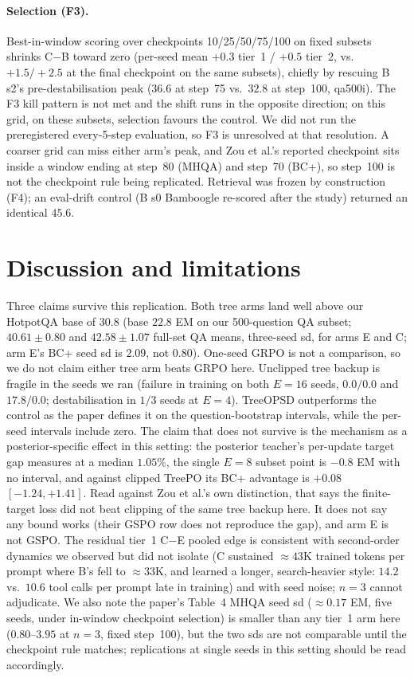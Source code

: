 \documentclass[11pt]{article}
\begin{document}
\paragraph{Selection (F3).} Best-in-window scoring over checkpoints
10/25/50/75/100 on fixed subsets shrinks C$-$B toward zero (per-seed mean
$+0.3$ tier~1 / $+0.5$ tier~2, vs.\ $+1.5/+2.5$ at the final checkpoint
on the same subsets), chiefly by rescuing B s2's pre-destabilisation peak
($36.6$ at step~75 vs.\ $32.8$ at step~100, qa500i). The F3 kill pattern
is not met and the shift runs in the opposite direction; on this grid,
on these subsets, selection favours the control. We did not run the
preregistered every-5-step evaluation, so F3 is unresolved at that
resolution. A coarser grid can miss either arm's peak, and Zou et al.'s
reported checkpoint sits inside a window ending at step~80 (MHQA) and
step~70 (BC+), so step~100 is not the checkpoint rule being replicated.
Retrieval was
frozen by construction (F4); an eval-drift control (B s0 Bamboogle
re-scored after the study) returned an identical $45.6$.

\section{Discussion and limitations}

Three claims survive this replication. Both tree arms land well above
our HotpotQA base of $30.8$ (base $22.8$ EM on our 500-question QA subset;
$40.61 \pm 0.80$ and $42.58 \pm 1.07$ full-set QA means, three-seed sd,
for arms E and C; arm E's BC+ seed sd is $2.09$, not $0.80$). One-seed
GRPO is not a comparison, so we do not claim either tree arm beats GRPO
here. Unclipped tree backup is fragile in the seeds we ran (failure in
training on both $E{=}16$ seeds, $0.0/0.0$ and $17.8/0.0$; destabilisation
in $1/3$ seeds at $E{=}4$). TreeOPSD outperforms the control as the paper
defines it on the question-bootstrap intervals, while the per-seed
intervals include zero. The claim that does not survive is the mechanism
as a posterior-specific effect in this setting: the posterior teacher's
per-update target gap measures at a median $1.05\%$, the single $E{=}8$
subset point is $-0.8$ EM with no interval, and against clipped TreePO
its BC+ advantage is $+0.08$ $[-1.24, +1.41]$. Read against Zou et al.'s
own distinction, that says the finite-target loss did not beat clipping
of the same tree backup here. It does not say any bound works (their
GSPO row does not reproduce the gap), and arm E is not GSPO. The residual
tier~1 C$-$E pooled edge is consistent with second-order dynamics we
observed but did not isolate (C sustained $\approx\!43$K trained tokens
per prompt where B's fell to $\approx\!33$K, and learned a longer,
search-heavier style: $14.2$ vs.\ $10.6$ tool calls per prompt late in
training) and with seed noise; $n=3$ cannot adjudicate. We also note the
paper's Table~4 MHQA seed sd ($\approx\!0.17$ EM, five seeds, under
in-window checkpoint selection) is smaller than any tier~1 arm here
($0.80$--$3.95$ at $n=3$, fixed step~100), but the two sds are not
comparable until the checkpoint rule matches; replications at single
seeds in this setting should be read accordingly.
\end{document}
